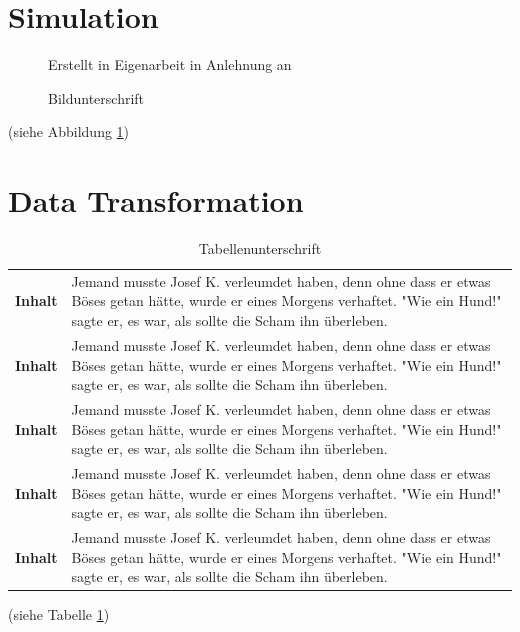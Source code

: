     \section{Simulation}
    \begin{figure}[H]
        \centering
        \caption{Bildunterschrift}
        \label{soqu3}
        \small{Erstellt in Eigenarbeit in Anlehnung an \cite[see][]{us2020}}
    \end{figure}
    \blindtext (siehe Abbildung \ref{soqu3})

    \section{Data Transformation}
    \begin{table}[H]
        \begin{tabular}{p{}p{}}
            \textbf{Inhalt} & Jemand musste Josef K. verleumdet haben, denn ohne dass er etwas Böses getan hätte, wurde er eines Morgens verhaftet. "Wie ein Hund!" sagte er, es war, als sollte die Scham ihn überleben.\\
            \textbf{Inhalt} & Jemand musste Josef K. verleumdet haben, denn ohne dass er etwas Böses getan hätte, wurde er eines Morgens verhaftet. "Wie ein Hund!" sagte er, es war, als sollte die Scham ihn überleben.\\
            \textbf{Inhalt} & Jemand musste Josef K. verleumdet haben, denn ohne dass er etwas Böses getan hätte, wurde er eines Morgens verhaftet. "Wie ein Hund!" sagte er, es war, als sollte die Scham ihn überleben.\\
            \textbf{Inhalt} & Jemand musste Josef K. verleumdet haben, denn ohne dass er etwas Böses getan hätte, wurde er eines Morgens verhaftet. "Wie ein Hund!" sagte er, es war, als sollte die Scham ihn überleben.\\
            \textbf{Inhalt} & Jemand musste Josef K. verleumdet haben, denn ohne dass er etwas Böses getan hätte, wurde er eines Morgens verhaftet. "Wie ein Hund!" sagte er, es war, als sollte die Scham ihn überleben.\\
        \end{tabular}
        \caption{Tabellenunterschrift}
        \label{tabe3}
    \end{table}
    \blindtext (siehe Tabelle \ref{tabe3})

